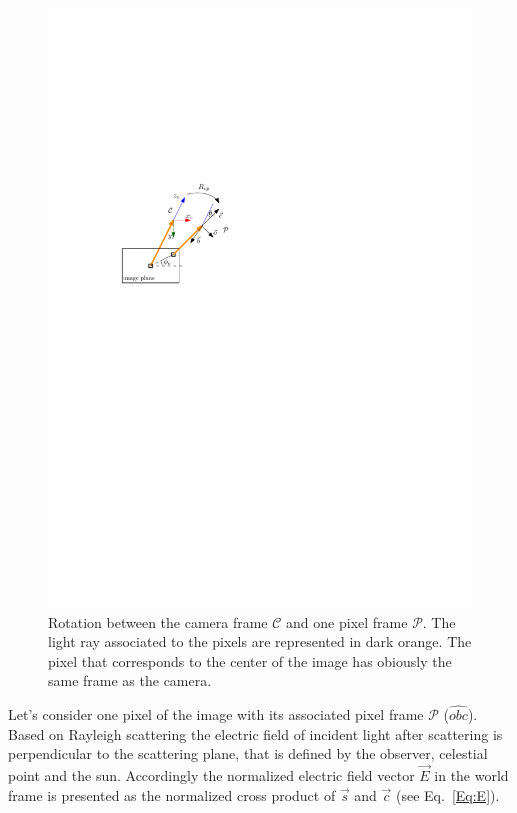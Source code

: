 \begin{figure}
  \centering
  \includegraphics[scale=0.8]{./content/intro/figures/pixelframe.pdf}
  \caption{Rotation between the camera frame $\mathcal{C}$ and one pixel frame $\mathcal{P}$. The light ray associated to the pixels are represented in dark orange. The pixel that corresponds to the center of the image has obiously the same frame as the camera.}
    \label{fig:pixelframe}
\end{figure}

Let's consider one pixel of the image with its associated pixel frame $\mathcal{P}$ ($\widehat{obc}$).
Based on Rayleigh scattering the electric field of incident light after
scattering is perpendicular to the scattering plane, that is defined by the
observer, celestial point and the sun.
Accordingly the normalized electric field vector $\vec{E}$ in the world frame
is presented as the normalized cross product of $\vec{s}$ and
$\vec{c}$ (see Eq.~\ref{Eq:E}).

